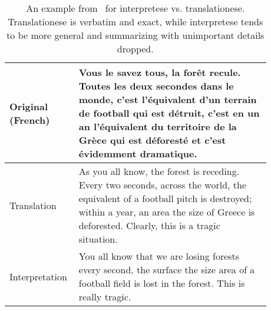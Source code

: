 \begin{table}[t]
    \small
    \begin{tabular}{p{0.18\linewidth} | p{0.7\linewidth}}
    \toprule
    \hspace{1000pt} Original (French) & Vous le savez tous, la for\^et recule. Toutes les deux secondes dans le monde, c'est l'\'equivalent d'un terrain de football qui est d\'etruit, c'est en un an l'\'equivalent du territoire de la Gr\`ece qui est d\'eforest\'e et c'est \'evidemment dramatique. \\
    \midrule
    \hspace{1000pt} Translation & As you all know, the forest is receding. Every two seconds, across the world, the equivalent of a football pitch is destroyed; within a year, an area the size of Greece is deforested. Clearly, this is a tragic situation. \\
    \midrule
    \hspace{1000pt} Interpretation & You all know that we are losing forests every second, the surface the size area of a football field is lost in the forest. This is really tragic. \\
    \bottomrule
    \end{tabular}
    \caption{An example from \vp~for interpretese vs. translationese. Translationese is verbatim and exact, while interpretese tends to be more general and summarizing with unimportant details dropped.}
    \label{tab:interpretataion_example}
\end{table}